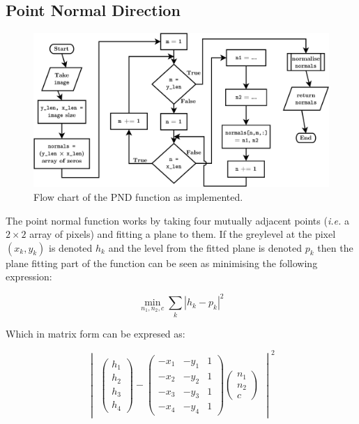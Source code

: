 \documentclass[11pt,a4paper]{article}
\begin{document}
\begin{multicols}{2}
	\subsection{Point Normal Direction}
\begin{figure}
\centering
\includegraphics[width = \textwidth]{PND}
\caption{Flow chart of the PND function as implemented.}
\label{fig:PND-alg}
\end{figure}

		The point normal function works by taking four mutually adjacent points (\textit{i.e.} a $2 \times 2$ array of pixels) and fitting a plane to them. If the greylevel at the pixel $(x_k, y_k)$ is denoted $h_k$ and the level from the fitted plane is denoted $p_k$ then the plane fitting part of the function can be seen as minimising the following expression:

		\begin{equation}
			\min_{n_1, n_2, c} \sum_k |h_k - p_k|^2
		\end{equation}
		
		Which in matrix form can be expresed as:

		\begin{equation}
			\begin{vmatrix}
			\begin{pmatrix}
			h_1 \\
			h_2 \\
			h_3 \\
			h_4
			\end{pmatrix}
			-
			\begin{pmatrix}
			-x_1 & -y_1 & 1 \\
			-x_2 & -y_2 & 1 \\
			-x_3 & -y_3 & 1 \\
			-x_4 & -y_4 & 1
			\end{pmatrix}
			\begin{pmatrix}
			n_1 \\
			n_2 \\
			c
			\end{pmatrix}
			\end{vmatrix}^2
		\end{equation}


\end{multicols}
\end{document}
